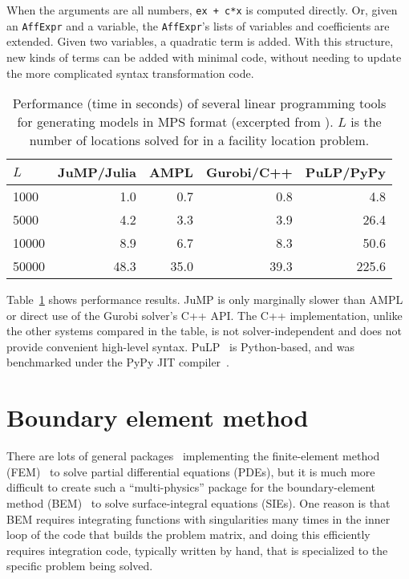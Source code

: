 When the arguments are all numbers, \texttt{ex + c*x} is computed directly.
Or, given an \texttt{AffExpr} and a variable, the \texttt{AffExpr}'s lists of
variables and coefficients are extended.
Given two variables, a quadratic term is added.
With this structure, new kinds of terms can be added with minimal code,
without needing to update the more complicated syntax transformation code.

\begin{table}[!t]
\begin{center}
\begin{tabular}{|l|r|r|r|r|}\hline
\textbf{$L$} & \textbf{JuMP/Julia} & \textbf{AMPL} & \textbf{Gurobi/C++} & \textbf{PuLP/PyPy} \\
\hline \hline
1000    & 1.0 & 0.7 & 0.8 & 4.8 \\
\hline
5000    & 4.2 & 3.3 & 3.9 & 26.4 \\
\hline
10000   & 8.9 & 6.7 & 8.3 & 50.6 \\
\hline
50000   & 48.3 & 35.0 & 39.3 & 225.6 \\
\hline
\end{tabular}
\end{center}
\caption[Performance of linear programming tools]{
\small{
Performance (time in seconds) of several linear programming tools for
generating models in MPS format (excerpted from \cite{LubinDunningIJOC}).
$L$ is the number of locations solved for in a facility location problem.
}
}
\label{jumpperf}
\end{table}

Table~\ref{jumpperf} shows performance results.
JuMP is only marginally slower than AMPL or direct use of the Gurobi solver's
C++ API.
The C++ implementation, unlike the other systems compared in the table,
is not solver-independent and does not provide convenient high-level syntax.
PuLP~\cite{mitchell2011pulp} is Python-based, and was benchmarked under the
PyPy JIT compiler~\cite{pypyjit}.


\section{Boundary element method}
\label{sec:BEM}

There are lots of general
packages~\cite{LoggOlgaardEtAl2012a,Rathgeber2015} implementing the
finite-element method (FEM)~\cite{Zienkiewicz13} to solve partial
differential equations (PDEs), but it is much more difficult to create
such a ``multi-physics'' package for the boundary-element method
(BEM)~\cite{Bonnet99,Chew09} to solve surface-integral equations
(SIEs).  One reason is that BEM requires integrating functions with singularities
many times in the inner loop of the code that builds the problem matrix, and
doing this efficiently requires integration code, typically written by hand, that is specialized to
the specific problem being solved.

